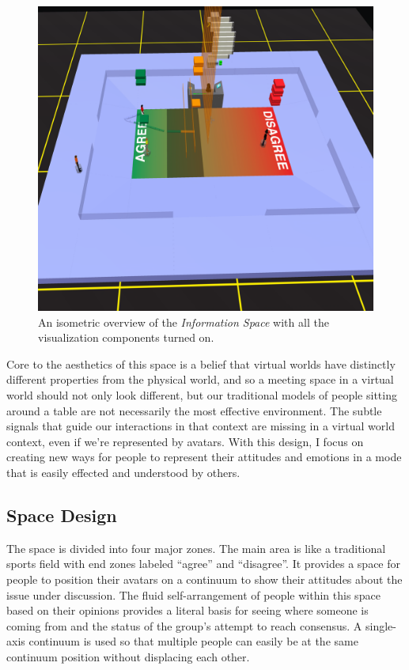 \begin{figure}[t]
	\includegraphics{figures/information-space-iso-overview.png}
	\caption{An isometric overview of the \emph{Information Space} with all the visualization components turned on.}
	\label{fig:information_space_overview}
\end{figure}

Core to the aesthetics of this space is a belief that virtual worlds have distinctly different properties from the physical world, and so a meeting space in a virtual world should not only look different, but our traditional models of people sitting around a table are not necessarily the most effective environment. The subtle signals that guide our interactions in that context are missing in a virtual world context, even if we're represented by avatars. With this design, I focus on creating new ways for people to represent their attitudes and emotions in a mode that is easily effected and understood by others.



\subsection{Space Design}

The space is divided into four major zones. The main area is like a traditional sports field with end zones labeled ``agree'' and ``disagree''. It provides a space for people to position their avatars on a continuum to show their attitudes about the issue under discussion. The fluid self-arrangement of people within this space based on their opinions provides a literal basis for seeing where someone is coming from and the status of the group's attempt to reach consensus. A single-axis continuum is used so that multiple people can easily be at the same continuum position without displacing each other.


